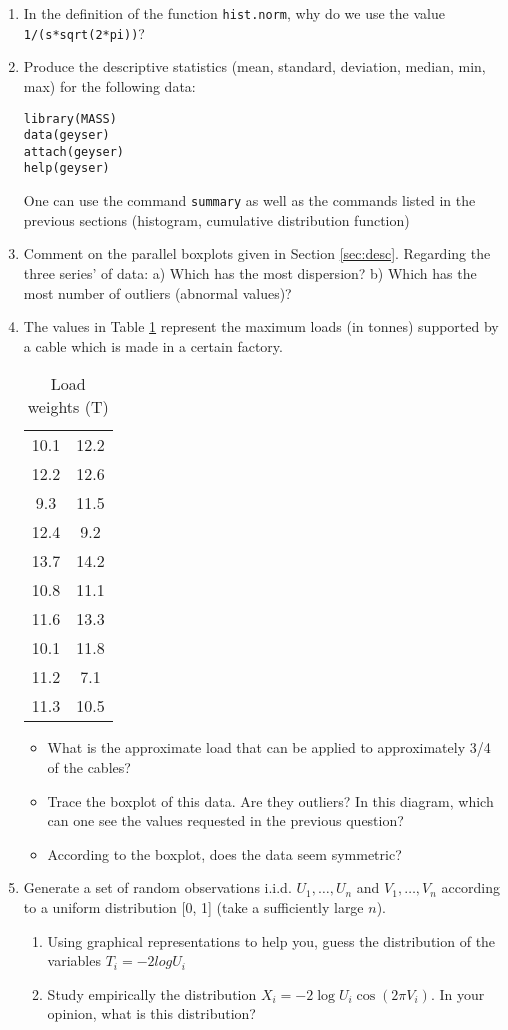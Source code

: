 \documentclass[a4paper,10pt]{article}
\begin{document}
\begin{enumerate} 
 \item In the definition of the function \texttt{hist.norm}, why do we use the value \texttt{1/(s*sqrt(2*pi))}?
\item Produce the descriptive statistics (mean, standard, deviation, median, min, max) for the following data: 
\begin{lstlisting} 
library(MASS)
data(geyser)
attach(geyser)
help(geyser)
\end{lstlisting}
One can use the command \texttt{summary} as well as the commands listed in the previous sections (histogram, cumulative distribution function) 
\item Comment on the parallel boxplots given in Section  \ref{sec:desc}. Regarding the three series' of data: a) Which has the most dispersion? b) Which has the most number of outliers (abnormal values)? 
\item The values in Table \ref{tab:loads} represent the maximum loads (in tonnes) supported by a cable which is made in a certain factory. 
\begin{table}
\begin{centering}
\begin{tabular}{c c} 
 10.1 & 12.2\\
12.2 & 12.6\\
9.3 & 11.5\\
12.4 & 9.2\\
13.7 & 14.2\\
10.8 & 11.1\\
11.6 & 13.3\\
10.1 & 11.8 \\
11.2 & 7.1\\
11.3 & 10.5\\
\end{tabular}
\end{centering}
\caption{Load weights (T)}\label{tab:loads}
\end{table}
\begin{itemize}
 \item  What is the approximate load that can be applied to approximately 3/4 of the cables? 
\item Trace the boxplot of this data. Are they outliers? In this diagram, which can one see the values requested in the previous question? 
\item According to the boxplot, does the data seem symmetric? 
\end{itemize}
\item Generate a set of random observations i.i.d. $U_1 , \ldots , U_n$ and $V_1 ,\ldots , V_n$ according to a uniform distribution [0, 1] (take a sufficiently large $n$).
\begin{enumerate}
\item Using graphical representations to help you, guess the distribution of the variables $T_i = -2 log U_i$ 
\item Study empirically the distribution $X_i = -2 \log U_i \cos(2 \pi V_i ).$ In your opinion, what is this distribution? 
\end{enumerate}
\end{enumerate}
\end{document}
